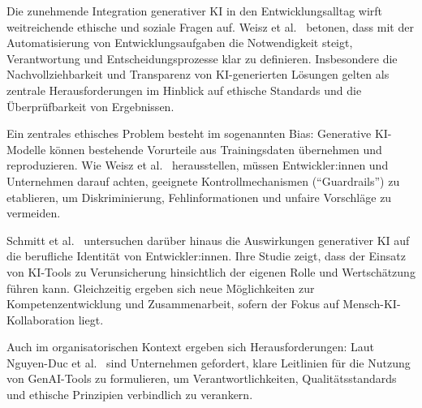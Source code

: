 Die zunehmende Integration generativer KI in den Entwicklungsalltag wirft
weitreichende ethische und soziale Fragen auf. Weisz et
al.~\cite{weisz_design_2024} betonen, dass mit der Automatisierung von
Entwicklungsaufgaben die Notwendigkeit steigt, Verantwortung und
Entscheidungsprozesse klar zu definieren. Insbesondere die Nachvollziehbarkeit
und Transparenz von KI-generierten Lösungen gelten als zentrale
Herausforderungen im Hinblick auf ethische Standards und die Überprüfbarkeit
von Ergebnissen.

Ein zentrales ethisches Problem besteht im sogenannten Bias: Generative
KI-Modelle können bestehende Vorurteile aus Trainingsdaten übernehmen und
reproduzieren. Wie Weisz et al.~\cite{weisz_design_2024} herausstellen, müssen
Entwickler:innen und Unternehmen darauf achten, geeignete Kontrollmechanismen
(\enquote{Guardrails}) zu etablieren, um Diskriminierung, Fehlinformationen und
unfaire Vorschläge zu vermeiden.

Schmitt et al.~\cite{schmitt_generative_2024} untersuchen darüber hinaus die
Auswirkungen generativer KI auf die berufliche Identität von Entwickler:innen.
Ihre Studie zeigt, dass der Einsatz von KI-Tools zu Verunsicherung hinsichtlich
der eigenen Rolle und Wertschätzung führen kann. Gleichzeitig ergeben sich neue
Möglichkeiten zur Kompetenzentwicklung und Zusammenarbeit, sofern der Fokus auf
Mensch-KI-Kollaboration liegt.

Auch im organisatorischen Kontext ergeben sich Herausforderungen: Laut
Nguyen-Duc et al.~\cite{nguyen-duc_generative_2023} sind Unternehmen gefordert,
klare Leitlinien für die Nutzung von GenAI-Tools zu formulieren, um
Verantwortlichkeiten, Qualitätsstandards und ethische Prinzipien verbindlich zu
verankern.
